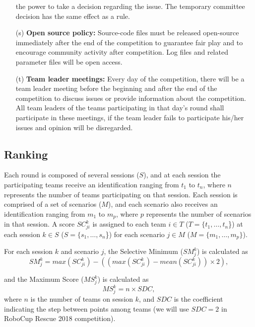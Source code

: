 \documentclass{article}
\begin{document}
\begin{itemize}
the power to take a decision regarding the issue. The temporary committee
decision has the same effect as a rule.
\item[(s)] \textbf{Open source policy:} Source-code files must be released 
open-source immediately after the end of the competition to guarantee fair play 
and to encourage community activity after competition. Log files and related 
parameter files will be open access.
\item[(t)] \textbf{Team leader meetings:} Every day of the competition, there
will be a team leader meeting before the beginning and after the end of the
competition to discuss issues or provide information about the competition. All
team leaders of the teams participating in that day's round shall participate in
these meetings, if the team leader fails to participate his/her issues and
opinion will be disregarded.
\end{itemize}
\subsection{Ranking}
\label{subsec:ranking}
Each round is composed of several sessions ($S$), and at each session the 
participating teams receive an identification ranging from $t_{1}$ to $t_{n}$, 
where $n$ represents the number of teams participating on that session. Each 
session is comprised of a set of scenarios ($M$), and each scenario also 
receives an identification ranging from $m_{1}$ to $m_{p}$, where $p$ 
represents the number of scenarios in that session. A score $SC_{ji}^{k}$ is 
assigned to each team $i \in T$ ($T = \{t_{1},\dots,t_{n}$\}) at each session $k 
\in S$ ($S = \{s_{1},\dots,s_{n}$\}) for each scenario $j \in M$ ($M = 
\{m_{1},\dots,m_{p}\}$). 

For each session $k$ and scenario $j$, the Selective Minimum ($SM_{j}^{k}$) is 
calculated as
\begin{equation}
SM_{j}^{k} = max\left(SC_{ji}^{k}\right) - \left( \left( max \left( SC_{ji}^{k} 
\right) - mean \left( SC_{ji}^{k} \right)\right) \times 2 \right),
\end{equation}

and the Maximum Score ($MS_{j}^{k}$) is calculated as
\begin{equation}
MS_{j}^{k} = n \times SDC,
\end{equation}
\noindent where $n$ is the number of teams on session $k$, and $SDC$ is the 
coefficient indicating the step between points among teams (we will use $SDC = 
2$ in RoboCup Rescue 2018 competition).
\end{document}
